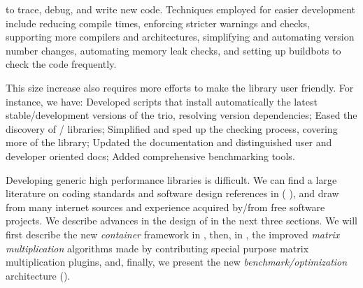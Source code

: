 to trace, debug, and write new code. Techniques employed
for easier development include reducing
compile times, enforcing stricter warnings and checks, supporting more
compilers and architectures, simplifying and automating version number
changes, automating memory leak checks, and setting up buildbots to check the code
frequently.
%
\par
%
This size increase also requires more efforts to make the library user friendly. For
instance, we have:
%
Developed %
scripts that install automatically the
latest stable/development versions of the trio, resolving version
dependencies;
%
Eased the discovery of / libraries;
%
Simplified and sped up the checking process, covering more of the library;
%
Updated the documentation and distinguished user and developer oriented docs;
%
Added comprehensive benchmarking tools.
%
%
\par
%
Developing generic high performance libraries is difficult. We can find a
large literature on coding standards and software design references in (\cf{}
\cite{alexandrescu:01:modern,gamma:95:design,sutter:05:cpp,stroustrup1994design,Douglas:05:GPHP}),
and draw from many internet sources and experience acquired by/from free
software projects.
%
%
We describe advances in the design of \linbox in the next
three sections. We will first describe the new \emph{container} framework in
, then,
in ,
the improved \emph{matrix multiplication} algorithms
made by contributing special purpose matrix multiplication plugins, and, finally, we present the new \emph{benchmark/optimization}
architecture ().
%
\par

